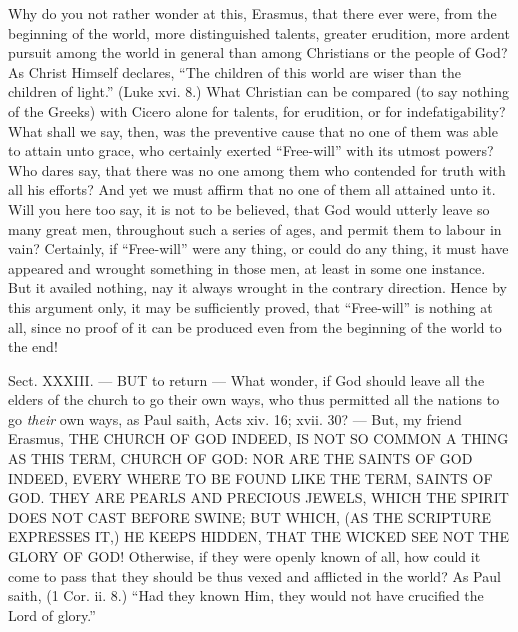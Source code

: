 Why do you not rather wonder at this, Erasmus, that there ever were, from the beginning of the world, more distinguished talents, greater erudition, more ardent pursuit among the world in general than among Christians or the people of God? As Christ Himself declares, “The children of this world are wiser than the children of light.” (Luke xvi. 8.) What Christian can be compared (to say nothing of the Greeks) with Cicero alone for talents, for erudition, or for indefatigability? What shall we say, then, was the preventive cause that no one of them was able to attain unto grace, who certainly exerted “Free-will” with its utmost powers? Who dares say, that there was no one among them who contended for truth with all his efforts? And yet we must affirm that no one of them all attained unto it. Will you here too say, it is not to be believed, that God would utterly leave so many great men, throughout such a series of ages, and permit them to labour in vain? Certainly, if “Free-will” were any thing, or could do any thing, it must have appeared and wrought something in those men, at least in some one instance. But it availed nothing, nay it always wrought in the contrary direction. Hence by this argument only, it may be sufficiently proved, that “Free-will” is nothing at all, since no proof of it can be produced even from the beginning of the world to the end!


Sect. XXXIII. — BUT to return — What wonder, if God should leave all the elders of the church to go their own ways, who thus permitted all the nations to go \emph{their }own ways, as Paul saith, Acts xiv. 16; xvii. 30? — But, my friend Erasmus, \textsc{THE CHURCH OF GOD INDEED, IS NOT SO COMMON A THING AS THIS TERM, CHURCH OF GOD: NOR ARE THE SAINTS OF GOD INDEED, EVERY WHERE TO BE FOUND LIKE THE TERM, SAINTS OF GOD. THEY ARE PEARLS AND PRECIOUS JEWELS, WHICH THE SPIRIT DOES NOT CAST BEFORE SWINE; BUT WHICH, (AS THE SCRIPTURE EXPRESSES IT,) HE KEEPS HIDDEN, THAT THE WICKED SEE NOT THE GLORY OF GOD!} Otherwise, if they were openly known of all, how could it come to pass that they should be thus vexed and afflicted in the world? As Paul saith, (1 Cor. ii. 8.) “Had they known Him, they would not have crucified the Lord of glory.”

